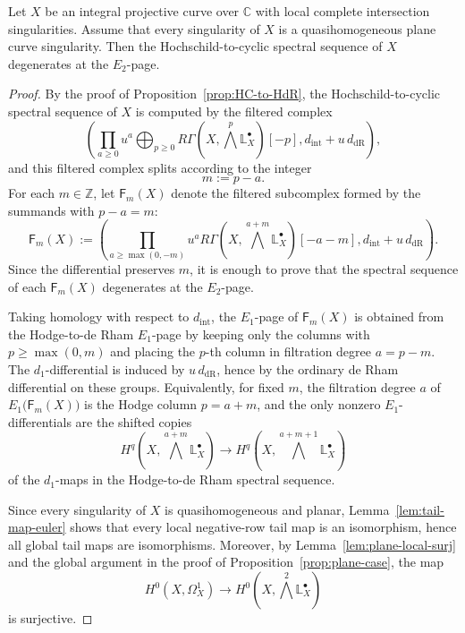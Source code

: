 \documentclass[12pt,reqno]{amsart}
\begin{document}
\begin{proposition}\label{prop:qhom-implies-HC}
Let \(X\) be an integral projective curve over \(\mathbb C\) with local complete intersection singularities. Assume that every singularity of \(X\) is a quasihomogeneous plane curve singularity. Then the Hochschild-to-cyclic spectral sequence of \(X\) degenerates at the \(E_2\)-page.
\end{proposition}

\begin{proof}
By the proof of Proposition~\ref{prop:HC-to-HdR}, the Hochschild-to-cyclic spectral sequence of \(X\) is computed by the filtered complex
\[
\left(
\prod_{a\ge 0}u^a\bigoplus_{p\ge 0}R\Gamma\!\left(X,\bigwedge^p\mathbb{L}^{\bullet}_X\right)[-p],
d_{\mathrm{int}}+u\,d_{\mathrm{dR}}
\right),
\]
and this filtered complex splits according to the integer
\[
m:=p-a.
\]
For each \(m\in \mathbb Z\), let \(\mathsf F_m(X)\) denote the filtered subcomplex formed by the summands with \(p-a=m\):
\[
\mathsf F_m(X):=
\left(
\prod_{a\ge \max(0,-m)}u^aR\Gamma\!\left(X,\bigwedge^{a+m}\mathbb{L}^{\bullet}_X\right)[-a-m],
d_{\mathrm{int}}+u\,d_{\mathrm{dR}}
\right).
\]
Since the differential preserves \(m\), it is enough to prove that the spectral sequence of each \(\mathsf F_m(X)\) degenerates at the \(E_2\)-page.

Taking homology with respect to \(d_{\mathrm{int}}\), the \(E_1\)-page of
\(\mathsf F_m(X)\) is obtained from the Hodge-to-de Rham \(E_1\)-page by keeping
only the columns with \(p\ge \max(0,m)\) and placing the \(p\)-th column in filtration degree \(a=p-m\). The \(d_1\)-differential is induced by \(u\,d_{\mathrm{dR}}\), hence by the ordinary de Rham differential on these groups.
Equivalently, for fixed \(m\), the filtration degree \(a\) of
\(E_1\bigl(\mathsf F_m(X)\bigr)\) is the Hodge column \(p=a+m\), and the only
nonzero \(E_1\)-differentials are the shifted copies
\[
H^q\!\left(X,\bigwedge^{a+m}\mathbb{L}^{\bullet}_X\right)\longrightarrow
H^q\!\left(X,\bigwedge^{a+m+1}\mathbb{L}^{\bullet}_X\right)
\]
of the \(d_1\)-maps in the Hodge-to-de Rham spectral sequence.

Since every singularity of \(X\) is quasihomogeneous and planar, Lemma~\ref{lem:tail-map-euler} shows that every local negative-row tail map is an isomorphism, hence all global tail maps are isomorphisms. Moreover, by Lemma~\ref{lem:plane-local-surj} and the global argument in the proof of Proposition~\ref{prop:plane-case}, the map
\[
H^0(X,\Omega_X^1)\longrightarrow H^0\!\left(X,\bigwedge^2\mathbb{L}^{\bullet}_X\right)
\]
is surjective.


\end{proof}
\end{document}
